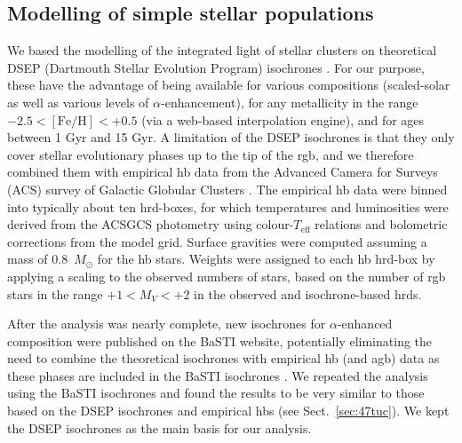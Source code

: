 \documentclass{aa}
\begin{document}
\subsection{Modelling of simple stellar populations}
\label{sec:sspmod}

We based the modelling of the integrated light of stellar clusters on theoretical DSEP (Dartmouth Stellar Evolution Program) isochrones \citep{Dotter2007}. For our purpose, these have the advantage of being available for various compositions (scaled-solar as well as various levels of $\alpha$-enhancement), for any metallicity in the range $-2.5 < \mathrm{[Fe/H]} < +0.5$ (via a web-based interpolation engine), and for ages between 1 Gyr and 15 Gyr. A limitation of the DSEP isochrones is that they only cover stellar evolutionary phases up to the tip of the \ac{rgb}, and we therefore combined them with empirical \ac{hb} data from the Advanced Camera for Surveys (ACS) survey of Galactic Globular Clusters \citep[ACSGCS; ][]{Sarajedini2007}. The empirical \ac{hb} data were binned into typically about ten \ac{hrd}-boxes, for which temperatures and luminosities were derived from the ACSGCS photometry using colour-$T_\mathrm{eff}$ relations and bolometric corrections from the \citet{Castelli2003} model grid. Surface gravities were computed assuming a mass of 0.8~$M_\odot$ for the \ac{hb} stars.  Weights were assigned to each \ac{hb} \ac{hrd}-box by applying a scaling to the observed numbers of stars, based on the number of \ac{rgb} stars in the range $+1 < M_V < +2$ in the observed and isochrone-based \acp{hrd}. 

After the analysis was nearly complete, new isochrones for $\alpha$-enhanced composition were published on the BaSTI website, potentially eliminating the need to combine the theoretical isochrones with empirical \ac{hb} (and \ac{agb}) data as these phases are included in the BaSTI isochrones \citep{Hidalgo2018,Pietrinferni2021}. We repeated the analysis using the BaSTI isochrones and found the results to be very similar to those based on the DSEP isochrones and empirical \acp{hb} (see Sect.~\ref{sec:47tuc}). We kept the DSEP isochrones as the main basis for our analysis.
\end{document}
